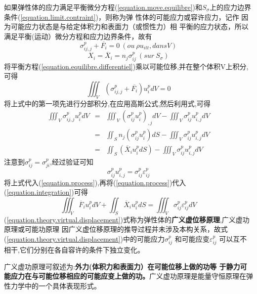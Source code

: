 \documentclass{article}
\begin{document}
如果弹性体的应力满足平衡微分方程(\ref{equation.move.equilibre})和$S_{\sigma}$上的应力边界条件(\ref{equation.limit.contraint})，则称为弹
性体的可能应力或容许应力，记作 因为可能应力状态是与给定体积力和表面力（或惯性力）相
平衡的应力状态，所以满足平衡(运动）微分方程和应力边界条件，故有
\begin{equation}
 \sigma_{ij,j}^p + \overline{F_i}=0 ~ (ou ~\rho u_{itt},dans V)
 \label{equation.equilibre.differentiel}
\end{equation}
\begin{equation}
 X_i=\overline{X}_i=n_j \sigma_{ij}^p  ~ (sur ~S_{\sigma})
\end{equation}
将平衡方程(\ref{equation.equilibre.differentiel})乘以可能位移,并在整个体积V上积分,可得
\begin{equation}
 \iiint_V(\sigma_{ij,j}^p + \overline{F_i})u_i^p dV=0
 \label{equation.integration}
\end{equation}
将上式中的第一项先进行分部积分,在应用高斯公式,然后利用式,可得
\begin{eqnarray}
    \iiint_V\sigma_{ij,j}^p u_i^p dV & = & \iiint_V(\sigma_{ij}^p u_{i}^p)_{,j}dV - \iiint_V \sigma_{ij}^p u_{i,j}^p dV \\
                                    &  =  & \iint_S n_j(\sigma_{ij}^p u_{i}^p)dS - \iiint_V \sigma_{ij}^p u_{i,j}^p dV \\
                                    &  =  &\iint_S (\overline{X}_i u_i^pdS) - \iiint_V \sigma_{ij}^p u_{i,j}^p dV
\label{equation.process}
\end{eqnarray}
注意到$\sigma_{ij}^p=\sigma_{ji}^p$,经过验证可知
\begin{equation}
\sigma_{ij}^p u_{i,j}^p = \sigma_{ij}^p \varepsilon_{ij}^p
\end{equation}
将上式代入(\ref{equation.process}),再将(\ref{equation.process})代入(\ref{equation.integration})可得
\begin{equation}
 \iiint_V \overline{F}_i u_i^p dV + \iint_S \overline{X}_i u_i^p dS = \iiint_V \sigma_{ij}^p \varepsilon_{ij}^p dV
 \label{equation.theory.virtual.displacement}
\end{equation}
(\ref{equation.theory.virtual.displacement})式称为弹性体的\textbf{广义虚位移原理},广义虚功原理或可能功原理
因广义虚位移原理的推导过程并未涉及本构关系，故式(\ref{equation.theory.virtual.displacement})中的可能应力$\sigma_{ij}^p$
和可能应变$\varepsilon_{ij}^p$ 可以互不相干,它们分别在各自容许的条件下独立变化。

广义虚功原理可叙述为:\textbf{外力(体积力和表面力）在可能位移上做的功等
于静力可能应力在与可能位移相应的可能应变上做的功。}广义虚功原理是能量守恒原理在弹性力学中的一个具体表现形式。
\end{document}
